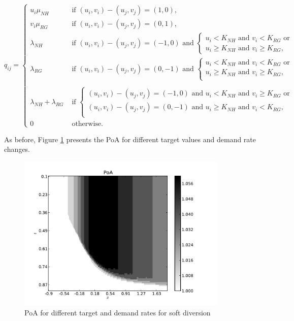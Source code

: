 \documentclass{article}
\begin{document}
\begin{equation}
q_{ij}=\begin{cases} u_i\mu_{NH} & \text{ if  } (u_i,v_i)-(u_j,v_j)=(1,0),\\
 v_i\mu_{RG} & \text{ if  } (u_i,v_i)-(u_j,v_j)=(0,1),\\
 \lambda_{NH} & \text{ if  } (u_i,v_i)-(u_j,v_j)=(-1,0) \text{ and }\left\{\begin{array}{l} u_i<K_{NH} \text{ and } v_i<K_{RG}  \text{ or } \\        u_i  \geq K_{NH} \text{ and } v_i  \geq K_{RG},\end{array}\right.\\
 \lambda_{RG} & \text{ if  } (u_i,v_i)-(u_j,v_j)=(0,-1) \text{ and }\left\{\begin{array}{l}u_i< K_{NH}\text{ and }v_i<K_{RG}\text{ or }\\u_i\geq K_{NH}\text{ and }v_i\geq K_{RG}, \\\end{array}\right.\\\\
\lambda_{NH}+\lambda_{RG} & \text{ if  } \left\{\begin{array}{l} (u_i,v_i)-(u_j,v_j)=(-1,0) \text{ and } u_i<K_{NH} \text{ and } v_i \geq K_{RG} \text{ or }\\ (u_i,v_i)-(u_j,v_j)=(0,-1) \text{ and } u_i \geq K_{NH} \text{ and } v_i < K_{RG}, \\\end{array}\right.\\
0 & \text{ otherwise}.
\end{cases}
\end{equation}


As before, Figure \ref{Fig:target_demand_model2} presents the PoA for different target values and demand rate changes.

\begin{figure}[!htbp]
\begin{center}
\includegraphics[width=10cm]{./Images/model2targetvdemand.pdf}
\caption{PoA for different target and demand rates for soft diversion} \label{Fig:target_demand_model2}
\end{center}
\end{figure}
\end{document}
